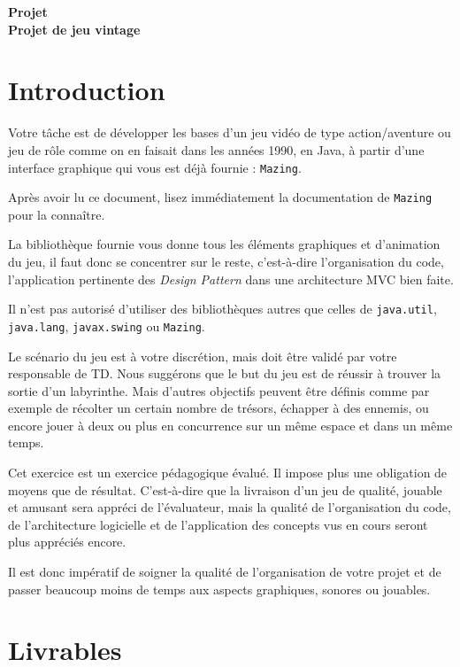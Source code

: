 \documentclass{article}
\newcommand{\bigtext}{\fontsize{16pt}{20pt}\selectfont}
\newcommand{\code}[1]{\lstinline{#1}}
\newcommand{\PROJECTheader}[1]{
    \begin{tcolorbox}[colback=gray!10!white, colframe=gray!80!black, width=\textwidth, sharp corners]
        \centering
        \vspace{0.2cm}
        \textbf{\Large Projet} \\
        \textbf{#1}
    \end{tcolorbox}
}
\begin{document}
\bigtext

\PROJECTheader{Projet de jeu vintage}




\section*{Introduction}

Votre tâche est de développer les bases d'un jeu vidéo de type action/aventure ou jeu de rôle comme on en faisait dans les 
années 1990, en Java, à partir d'une interface graphique qui vous est déjà fournie : \texttt{Mazing}.

Après avoir lu ce document, lisez immédiatement la documentation de \texttt{Mazing} pour la connaître.

La bibliothèque fournie vous donne tous les éléments graphiques et d'animation du jeu, il faut donc se concentrer sur le reste, 
c'est-à-dire l'organisation du code, l'application pertinente des \textit{Design Pattern} dans une architecture MVC bien faite.

Il n'est pas autorisé d'utiliser des bibliothèques autres que celles de \code{java.util}, \code{java.lang}, \code{javax.swing} ou \code{Mazing}.

Le scénario du jeu est à votre discrétion, mais doit être validé par votre responsable de TD. 
Nous suggérons que le but du jeu est de réussir à trouver la sortie d'un labyrinthe. 
Mais d'autres objectifs peuvent être définis comme par exemple de récolter un certain nombre de trésors, échapper à des ennemis, 
ou encore jouer à deux ou plus en concurrence sur un même espace et dans un même temps.

Cet exercice est un exercice pédagogique évalué. Il impose plus une obligation de moyens que de résultat. C'est-à-dire que
la livraison d'un jeu de qualité, jouable et amusant sera appréci de l'évaluateur, mais la qualité de l'organisation du code, 
de l'architecture logicielle et de l'application des concepts vus en cours seront plus appréciés encore.

Il est donc impératif de soigner la qualité de l'organisation de votre projet et de passer beaucoup moins de temps 
aux aspects graphiques, sonores ou jouables.

\section*{Livrables}
\end{document}
